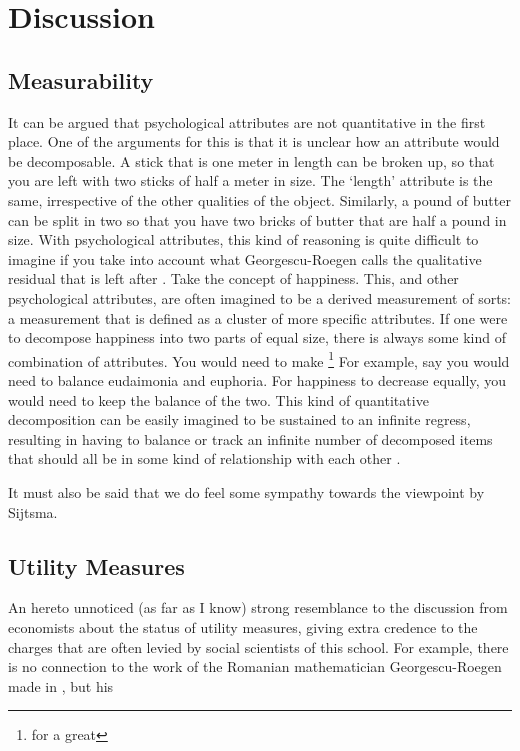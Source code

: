 \documentclass[utf8]{FrontiersinVancouver}
\begin{document}

\section{Discussion}

\subsection{Measurability}
It can be argued that psychological attributes are not quantitative in the first place. One of the arguments for this is that it is unclear how an attribute would be decomposable. A stick that is one meter in length can be broken up, so that you are left with two sticks of half a meter in size. The `length' attribute is the same, irrespective of the other qualities of the object. Similarly, a pound of butter can be split in two so that you have two bricks of butter that are half a pound in size. With psychological attributes, this kind of reasoning is quite difficult to imagine if you take into account what Georgescu-Roegen calls the qualitative residual that is left after . Take the concept of happiness. This, and other psychological attributes, are often imagined to be a derived measurement of sorts: a measurement that is defined as a cluster of more specific attributes. If one were to decompose happiness into two parts of equal size, there is always some kind of combination of attributes. You would need to make  \footnote{for a great } For example, say you would need to balance eudaimonia and euphoria. For happiness to decrease equally, you would need to keep the balance of the two. This kind of quantitative decomposition can be easily imagined to be sustained to an infinite regress, resulting in having to balance or track an infinite number of decomposed items that should all be in some kind of relationship with each other . 

It must also be said that we do feel some sympathy towards the viewpoint by Sijtsma\citep{sijtsmaPsychologicalMeasurementPhysics2012}. 

\subsection{Utility Measures}
An hereto unnoticed (as far as I know) strong resemblance to the discussion from economists about the status of utility measures, giving extra credence to the charges that are often levied by social scientists of this school. For example, there is no connection to the work of the Romanian mathematician Georgescu-Roegen made in , but his 
\end{document}
